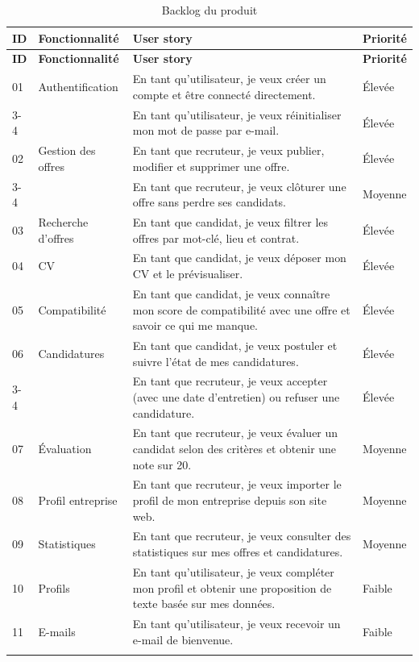 \documentclass[12pt,a4paper]{report}
\newcommand{\thead}[1]{\textbf{#1}}
\begin{document}
\begin{longtable}{|p{0.6cm}|p{3cm}|p{8.6cm}|p{1.6cm}|}
\hline
\rowcolor{headgray}\thead{ID} & \thead{Fonctionnalité} & \thead{User story} & \thead{Priorité} \\ \hline
\endfirsthead
\hline
\rowcolor{headgray}\thead{ID} & \thead{Fonctionnalité} & \thead{User story} & \thead{Priorité} \\ \hline
\endhead
01 & Authentification & En tant qu'utilisateur, je veux créer un compte et être connecté directement. & Élevée \\ \cline{3-4}
 & & En tant qu'utilisateur, je veux réinitialiser mon mot de passe par e-mail. & Élevée \\ \hline
02 & Gestion des offres & En tant que recruteur, je veux publier, modifier et supprimer une offre. & Élevée \\ \cline{3-4}
 & & En tant que recruteur, je veux clôturer une offre sans perdre ses candidats. & Moyenne \\ \hline
03 & Recherche d'offres & En tant que candidat, je veux filtrer les offres par mot-clé, lieu et contrat. & Élevée \\ \hline
04 & CV & En tant que candidat, je veux déposer mon CV et le prévisualiser. & Élevée \\ \hline
05 & Compatibilité & En tant que candidat, je veux connaître mon score de compatibilité avec une offre et savoir ce qui me manque. & Élevée \\ \hline
06 & Candidatures & En tant que candidat, je veux postuler et suivre l'état de mes candidatures. & Élevée \\ \cline{3-4}
 & & En tant que recruteur, je veux accepter (avec une date d'entretien) ou refuser une candidature. & Élevée \\ \hline
07 & Évaluation & En tant que recruteur, je veux évaluer un candidat selon des critères et obtenir une note sur 20. & Moyenne \\ \hline
08 & Profil entreprise & En tant que recruteur, je veux importer le profil de mon entreprise depuis son site web. & Moyenne \\ \hline
09 & Statistiques & En tant que recruteur, je veux consulter des statistiques sur mes offres et candidatures. & Moyenne \\ \hline
10 & Profils & En tant qu'utilisateur, je veux compléter mon profil et obtenir une proposition de texte basée sur mes données. & Faible \\ \hline
11 & E-mails & En tant qu'utilisateur, je veux recevoir un e-mail de bienvenue. & Faible \\ \hline
\caption{Backlog du produit}\label{tab:backlog}\\
\end{longtable}
\end{document}

